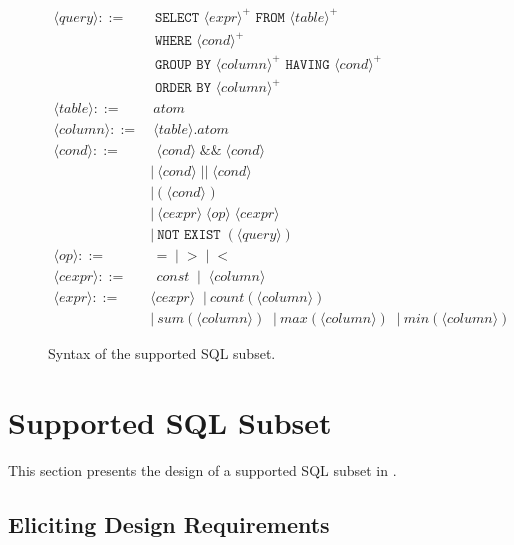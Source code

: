 \newcommand{\q}{\langle query\rangle}
\newcommand{\db}{\langle db\rangle}
\newcommand{\pat}{\langle pat\rangle}
\newcommand{\bug}{\langle bug\rangle}
\newcommand{\dist}{\langle distance\rangle}
\newcommand{\sem}[1]{\llbracket #1\rrbracket}
\newcommand{\lit}[1]{\texttt{#1}}

\newcommand{\column}{\langle column\rangle}
\newcommand{\dbtable}{\langle table\rangle}
\newcommand{\cond}{\langle cond\rangle}
\newcommand{\op}{\langle op\rangle}
\newcommand{\e}{\langle expr\rangle}
\newcommand{\ce}{\langle cexpr\rangle}

\begin{figure}[t]
\footnotesize%
\begin{align*}
\q ::= {} 
	& \texttt{ SELECT } \e^+ \texttt{ FROM } \dbtable^+ \\
        & \texttt{ WHERE } \cond^+ \\ 
	&  \texttt{ GROUP BY } \column^+ \texttt{ HAVING } \cond^+\\
	&  \texttt{ ORDER BY } \column^+ \\
\dbtable::= {} &\ atom \\
\column ::= {} &\ \dbtable.atom\\
\cond ::= {} &\ \ \cond \;\texttt{\&\&}\; \cond \\ 
    & |\ \cond \;\texttt{||}\; \cond \\
    & |\ \texttt{(}\;\cond\;\texttt{)} \\
    & |\ \ce \;\op\; \ce \\
    & |\ \texttt{NOT EXIST} \;(\q) \\
\op ::= {} &\ \ \texttt{=} \;\;|\;\; \texttt{>}  \;\;|\;\; \texttt{<}\\
\ce ::= {} &\ \ const \;\;|\;\; \column  \;\; \\
\e ::= {} & \ce \;\;|\ count(\column) \\
    & |\ sum(\column) \;\;|\ max(\column) \;\;|\ min(\column) 
\end{align*}
\normalsize%
\caption{Syntax of the supported SQL subset.}
\label{fig:syntax}
\end{figure}


\section{Supported SQL Subset}
\label{sec:langsubset}

This section presents the design of
a supported SQL subset in \ourtool.

\subsection{Eliciting Design Requirements}

